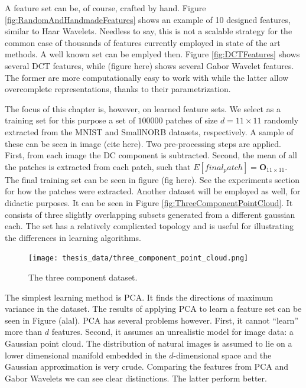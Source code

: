 \documentclass[12pt,a4paper,oneside,english]{UPBThesis}
\newcommand{\hctimes}[2]{{#1}\!\times\!{#2}}
\begin{document}
A feature set can be, of course, crafted by hand. Figure \ref{fig:RandomAndHandmadeFeatures} shows an example of 10 designed features, similar to Haar Wavelets. Needless to say, this is not a scalable strategy for the common case of thousands of features currently employed in state of the art methods. A well known set can be emplyed then. Figure \ref{fig:DCTFeatures} shows several DCT features, while (figure here) shows several Gabor Wavelet features. The former are more computationally easy to work with while the latter allow overcomplete representations, thanks to their parametrization.

The focus of this chapter is, however, on learned feature sets. We select as a training set for this purpose a set of $100000$ patches of size $d = \hctimes{11}{11}$ randomly extracted from the MNIST and SmallNORB datasets, respectively. A sample of these can be seen in image (cite here). Two pre-processing steps are applied. First, from each image the DC component is subtracted. Second, the mean of all the patches is extracted from each patch, such that $E[final_patch] = \textbf{O}_{\hctimes{11}{11}}$. The final training set can be seen in figure (fig here). See the experiments section for how the patches were extracted. Another dataset will be employed as well, for didactic purposes. It can be seen in Figure \ref{fig:ThreeComponentPointCloud}. It consists of three slightly overlapping subsets generated from a different gaussian each. The set has a relatively complicated topology and is useful for illustrating the differences in learning algorithms.

\begin{figure}
\centering
\texttt{[image: thesis\_data/three\_component\_point\_cloud.png]}
\caption{The three component dataset.}
\label{fig:ThreeComponentPointColud}
\end{figure}

The simplest learning method is PCA. It finds the directions of maximum variance in the dataset. The results of applying PCA to learn a feature set can be seen in Figure (alal). PCA has several problems however. First, it cannot ``learn'' more than $d$ features. Second, it assumes an unrealistic model for image data: a Gaussian point cloud. The distribution of natural images is assumed to lie on a lower dimensional manifold embedded in the $d$-dimensional space and the Gaussian approximation is very crude. Comparing the features from PCA and Gabor Wavelets we can see clear distinctions. The latter perform better.
\end{document}

